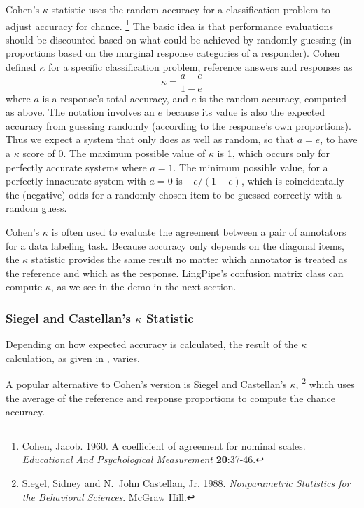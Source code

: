 Cohen's $\kappa$ statistic uses the random accuracy for a
classification problem to adjust accuracy for chance.%
%
\footnote{Cohen, Jacob. 1960. A coefficient of agreement for nominal
  scales. {\it Educational And Psychological Measurement} {\bf
    20}:37-46.}
%
The basic idea is that performance evaluations should be discounted
based on what could be achieved by randomly guessing (in proportions
based on the marginal response categories of a responder).  Cohen
defined $\kappa$ for a specific classification problem, reference
answers and responses as
%
\begin{equation}\label{eq:kappa-statistic}
\kappa = \frac{a - e}{1 - e}
\end{equation}
%
where $a$ is a response's total accuracy, and $e$ is the random
accuracy, computed as above.  The notation involves an $e$ because its
value is also the expected accuracy from guessing randomly (according
to the response's own proportions).  Thus we expect a system that only
does as well as random, so that $a = e$, to have a $\kappa$ score of
0.  The maximum possible value of $\kappa$ is 1, which occurs only for
perfectly accurate systems where $a = 1$.  The minimum possible value,
for a perfectly innacurate system with $a = 0$ is $-e/(1-e)$, which is
coincidentally the (negative) odds for a randomly chosen item to be
guessed correctly with a random guess.

Cohen's $\kappa$ is often used to evaluate the agreement between a
pair of annotators for a data labeling task.  Because accuracy only
depends on the diagonal items, the $\kappa$ statistic provides the
same result no matter which annotator is treated as the reference and
which as the response.  LingPipe's confusion matrix class can compute
$\kappa$, as we see in the demo in the next section.

\subsubsection{Siegel and Castellan's $\kappa$ Statistic}

Depending on how expected accuracy is calculated, the result of the
$\kappa$ calculation, as given in , varies.

A popular alternative to Cohen's version is Siegel and Castellan's
$\kappa$, 
%
\footnote{Siegel, Sidney and N.~John Castellan, Jr. 1988.  {\it
    Nonparametric Statistics for the Behavioral Sciences}. McGraw
  Hill.}
%
which uses the average of the reference and response
proportions to compute the chance accuracy.  

